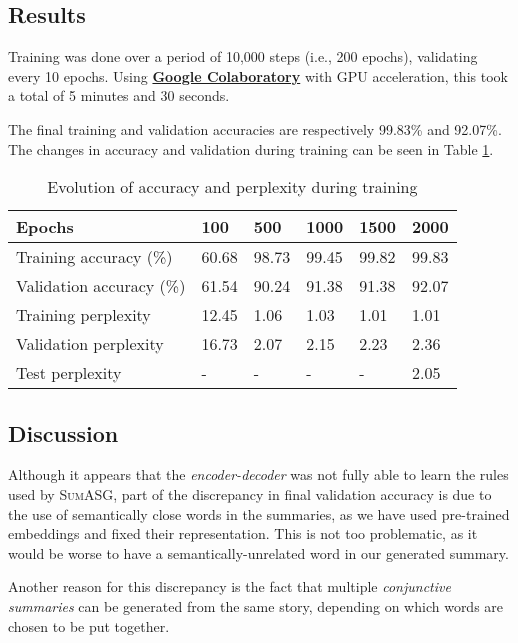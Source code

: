 \subsection{Results}

Training was done over a period of 10,000 steps (i.e., 200 epochs), validating every 10 epochs. Using \textbf{\href{https://colab.research.google.com/}{Google Colaboratory}} with GPU acceleration, this took a total of 5 minutes and 30 seconds.

The final training and validation accuracies are respectively 99.83\% and 92.07\%. The changes in accuracy and validation during training can be seen in Table \ref{table:training_metrics}.

\begin{table}[H]
\centering
\begin{tabular}{@{}llllll@{}}
\toprule
Epochs                & 100 & 500 & 1000 & 1500 & 2000 \\ \midrule
Training accuracy (\%)     & 60.68   & 98.73   & 99.45    & 99.82    & 99.83    \\
Validation accuracy (\%)   & 61.54   & 90.24   & 91.38    & 91.38    & 92.07    \\
Training perplexity   & 12.45   & 1.06   & 1.03    & 1.01    & 1.01    \\
Validation perplexity & 16.73   & 2.07   & 2.15    & 2.23    & 2.36    \\
Test perplexity & -   & -   & -    & -    & 2.05    \\ \bottomrule
\end{tabular}
\caption{Evolution of accuracy and perplexity during training}
\label{table:training_metrics}
\end{table}

\subsection{Discussion}

Although it appears that the \textit{encoder-decoder} was not fully able to learn the rules used by \textsc{SumASG}, part of the discrepancy in final validation accuracy is due to the use of semantically close words in the summaries, as we have used pre-trained embeddings and fixed their representation. This is not too problematic, as it would be worse to have a semantically-unrelated word in our generated summary.

Another reason for this discrepancy is the fact that multiple \textit{conjunctive summaries} can be generated from the same story, depending on which words are chosen to be put together.

